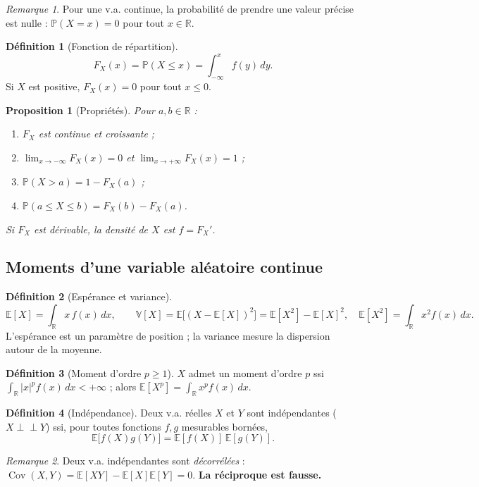 \documentclass[11pt,a4paper]{article}
\newcommand{\E}{\mathbb{E}}
\newcommand{\V}{\mathbb{V}}
\renewcommand{\P}{\mathbb{P}}
\newcommand{\R}{\mathbb{R}}
\newcommand{\Cov}{\operatorname{Cov}}
\newcommand{\1}{\mathbf{1}}
\theoremstyle{definition}
\newtheorem*{definition}{Définition}
\theoremstyle{plain}
\newtheorem*{proposition}{Proposition}
\theoremstyle{remark}
\newtheorem*{remarque}{Remarque}
\begin{document}
\begin{remarque}
Pour une v.a. continue, la probabilité de prendre une valeur précise est nulle : $\P(X=x)=0$ pour tout $x\in\R$.
\end{remarque}

\begin{definition}[Fonction de répartition]
\[
F_X(x)=\P(X\le x)=\int_{-\infty}^{x}f(y)\,dy.
\]
Si $X$ est positive, $F_X(x)=0$ pour tout $x\le0$.
\end{definition}

\begin{proposition}[Propriétés]
Pour $a,b\in\R$ :
\begin{enumerate}
  \item $F_X$ est continue et croissante ;
  \item $\displaystyle\lim_{x\to-\infty}F_X(x)=0$ et $\displaystyle\lim_{x\to+\infty}F_X(x)=1$ ;
  \item $\P(X>a)=1-F_X(a)$ ;
  \item $\P(a\le X\le b)=F_X(b)-F_X(a)$.
\end{enumerate}
Si $F_X$ est dérivable, la densité de $X$ est $f=F_X'$.
\end{proposition}

\subsection{Moments d'une variable aléatoire continue}

\begin{definition}[Espérance et variance]
\[
\E[X]=\int_{\R}x\,f(x)\,dx,\qquad
\V[X]=\E\big[(X-\E[X])^2\big]=\E[X^2]-\E[X]^2,\quad \E[X^2]=\int_{\R}x^2f(x)\,dx.
\]
L'espérance est un paramètre de position ; la variance mesure la dispersion autour de la moyenne.
\end{definition}

\begin{definition}[Moment d'ordre $p\ge1$]
$X$ admet un moment d'ordre $p$ ssi $\int_{\R}|x|^pf(x)\,dx<+\infty$ ; alors $\E[X^p]=\int_{\R}x^pf(x)\,dx$.
\end{definition}

\begin{definition}[Indépendance]
Deux v.a. réelles $X$ et $Y$ sont indépendantes ($X\perp\!\!\!\perp Y$) ssi, pour toutes fonctions $f,g$ mesurables bornées,
\[
\E\big[f(X)g(Y)\big]=\E[f(X)]\,\E[g(Y)].
\]
\end{definition}

\begin{remarque}
Deux v.a. indépendantes sont \emph{décorrélées} : $\Cov(X,Y)=\E[XY]-\E[X]\E[Y]=0$. \textbf{La réciproque est fausse.}
\end{remarque}
\end{document}
